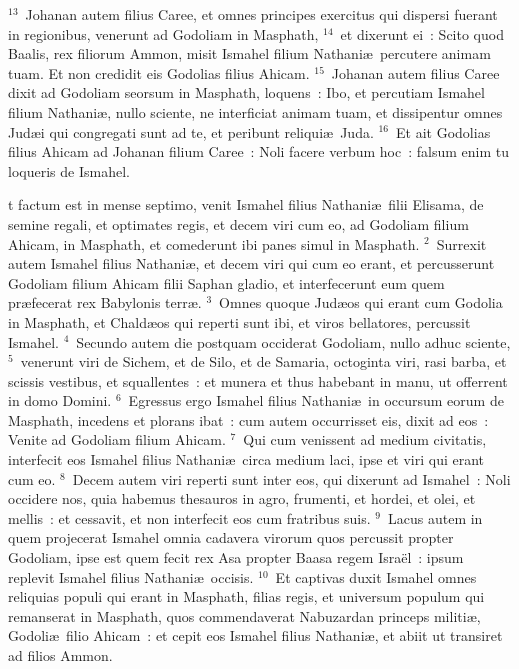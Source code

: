 ${}^{13}$~Johanan autem filius Caree, et omnes principes exercitus qui dispersi fuerant in regionibus, venerunt ad Godoliam in Masphath,
${}^{14}$~et dixerunt ei~: Scito quod Baalis, rex filiorum Ammon, misit Ismahel filium Nathani\ae\ percutere animam tuam. Et non credidit eis Godolias filius Ahicam.
${}^{15}$~Johanan autem filius Caree dixit ad Godoliam seorsum in Masphath, loquens~: Ibo, et percutiam Ismahel filium Nathani\ae , nullo sciente, ne interficiat animam tuam, et dissipentur omnes Jud\ae i qui congregati sunt ad te, et peribunt reliqui\ae\ Juda.
${}^{16}$~Et ait Godolias filius Ahicam ad Johanan filium Caree~: Noli facere verbum hoc~: falsum enim tu loqueris de Ismahel.

\bchapter
{}t factum est in mense septimo, venit Ismahel filius Nathani\ae\ filii Elisama, de semine regali, et optimates regis, et decem viri cum eo, ad Godoliam filium Ahicam, in Masphath, et comederunt ibi panes simul in Masphath.
${}^{2}$~Surrexit autem Ismahel filius Nathani\ae , et decem viri qui cum eo erant, et percusserunt Godoliam filium Ahicam filii Saphan gladio, et interfecerunt eum quem pr\ae fecerat rex Babylonis terr\ae .
${}^{3}$~Omnes quoque Jud\ae os qui erant cum Godolia in Masphath, et Chald\ae os qui reperti sunt ibi, et viros bellatores, percussit Ismahel.
${}^{4}$~Secundo autem die postquam occiderat Godoliam, nullo adhuc sciente,
${}^{5}$~venerunt viri de Sichem, et de Silo, et de Samaria, octoginta viri, rasi barba, et scissis vestibus, et squallentes~: et munera et thus habebant in manu, ut offerrent in domo Domini.
${}^{6}$~Egressus ergo Ismahel filius Nathani\ae\ in occursum eorum de Masphath, incedens et plorans ibat~: cum autem occurrisset eis, dixit ad eos~: Venite ad Godoliam filium Ahicam.
${}^{7}$~Qui cum venissent ad medium civitatis, interfecit eos Ismahel filius Nathani\ae\ circa medium laci, ipse et viri qui erant cum eo.
${}^{8}$~Decem autem viri reperti sunt inter eos, qui dixerunt ad Ismahel~: Noli occidere nos, quia habemus thesauros in agro, frumenti, et hordei, et olei, et mellis~: et cessavit, et non interfecit eos cum fratribus suis.
${}^{9}$~Lacus autem in quem projecerat Ismahel omnia cadavera virorum quos percussit propter Godoliam, ipse est quem fecit rex Asa propter Baasa regem Isra\"el~: ipsum replevit Ismahel filius Nathani\ae\ occisis.
${}^{10}$~Et captivas duxit Ismahel omnes reliquias populi qui erant in Masphath, filias regis, et universum populum qui remanserat in Masphath, quos commendaverat Nabuzardan princeps militi\ae , Godoli\ae\ filio Ahicam~: et cepit eos Ismahel filius Nathani\ae , et abiit ut transiret ad filios Ammon.


